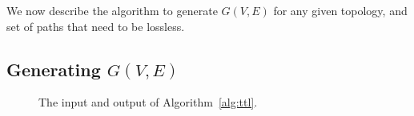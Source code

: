 We now describe the algorithm to generate $G(V,E)$ for any given topology, and set of
paths that need to be lossless.

\subsection{Generating $G(V,E)$}
\begin{figure}[t]
	\centering
	\caption{The input and output of Algorithm~\ref{alg:ttl}.}\label{fig:three_node}
\end{figure}

